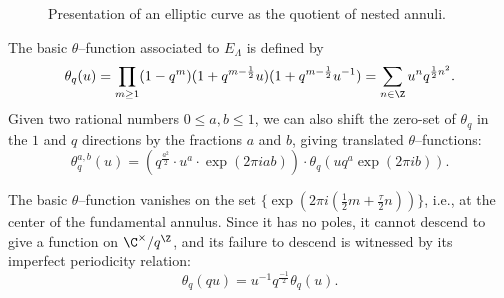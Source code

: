\begin{figure}
\begin{center}
\end{center}
\caption{Presentation of an elliptic curve as the quotient of nested annuli.}\label{AnnulusPicture}
\end{figure}

\begin{definition}
The basic $\theta$--function associated to $E_\Lambda$ is defined by \[\theta_q(u) = \prod_{m \ge 1} (1 - q^m) (1 + q^{m-\frac{1}{2}}u) (1 + q^{m-\frac{1}{2}}u^{-1}) = \sum_{n \in \Z} u^n q^{\frac{1}{2} n^2}.\]  Given two rational numbers $0 \le a, b \le 1$, we can also shift the zero-set of $\theta_q$ in the $1$ and $q$ directions by the fractions $a$ and $b$, giving translated $\theta$--functions: \[\theta_q^{a,b}(u) = \left(q^{\frac{a^2}{2}} \cdot u^a \cdot \exp(2 \pi i a b) \right) \cdot \theta_q(u q^a \exp(2 \pi i b)).\]
\end{definition}

The basic $\theta$--function vanishes on the set $\{\exp(2 \pi i (\frac{1}{2}m + \frac{\tau}{2}n))\}$, i.e., at the center of the fundamental annulus.  Since it has no poles, it cannot descend to give a function on $\C^\times / q^{\Z}$, and its failure to descend is witnessed by its imperfect periodicity relation: \[\theta_q(qu) = u^{-1} q^{\frac{-1}{2}} \theta_q(u).\]

